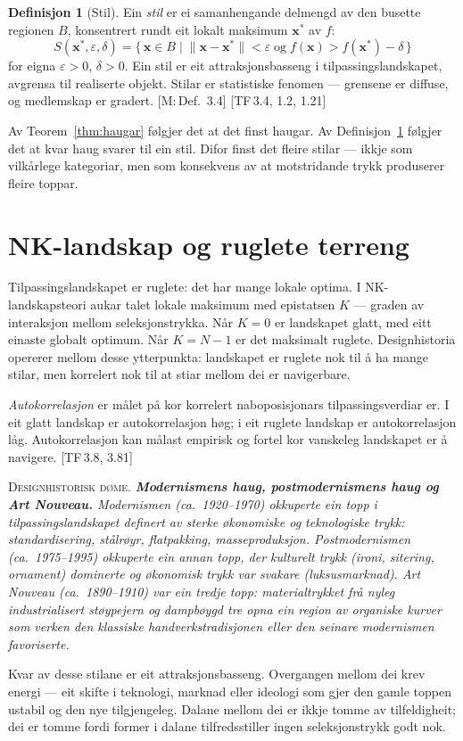 \documentclass[10pt]{book}
\theoremstyle{definition}
\newtheorem{definisjon}{Definisjon}[chapter]
\theoremstyle{plain}
\theoremstyle{remark}
\newenvironment{designhistorie}%
  {\medskip\noindent\textsc{Designhistorisk d\o me.}\itshape\enspace}%
  {\medskip}
\newcommand{\norm}[1]{\lVert #1 \rVert}
\newcommand{\TF}[1]{\textnormal{[TF\,#1]}}
\newcommand{\Mref}[1]{\textnormal{[M:\,#1]}}
\begin{document}
\begin{definisjon}[Stil]\label{def:stil}
Ein \emph{stil} er ei samanhengande delmengd av den busette regionen $B$, konsentrert rundt eit lokalt maksimum $\bm{x}^*$ av $f$:
\[
  S(\bm{x}^*, \varepsilon, \delta) = \bigl\{\, \bm{x} \in B \;\big|\;
    \norm{\bm{x} - \bm{x}^*} < \varepsilon \;\text{og}\; f(\bm{x}) > f(\bm{x}^*) - \delta \,\bigr\}
\]
for eigna $\varepsilon > 0$, $\delta > 0$. Ein stil er eit attraksjonsbasseng i tilpassingslandskapet, avgrensa til realiserte objekt. Stilar er statistiske fenomen --- grensene er diffuse, og medlemskap er gradert. \Mref{Def.~3.4} \TF{3.4, 1.2, 1.21}
\end{definisjon}

Av Teorem~\ref{thm:haugar} f\o lgjer det at det finst haugar. Av Definisjon~\ref{def:stil} f\o lgjer det at kvar haug svarer til ein stil. Difor finst det fleire stilar --- ikkje som vilk\aa rlege kategoriar, men som konsekvens av at motstridande trykk produserer fleire toppar.

\section{NK-landskap og ruglete terreng}\label{sec:landskap:NK}

Tilpassingslandskapet er ruglete: det har mange lokale optima. I NK-landskapsteori aukar talet lokale maksimum med epistatsen $K$ --- graden av interaksjon mellom seleksjonstrykka. N\aa r $K = 0$ er landskapet glatt, med eitt einaste globalt optimum. N\aa r $K = N - 1$ er det maksimalt ruglete. Designhistoria opererer mellom desse ytterpunkta: landskapet er ruglete nok til \aa{} ha mange stilar, men korrelert nok til at stiar mellom dei er navigerbare.

\emph{Autokorrelasjon} er m\aa let p\aa{} kor korrelert naboposisjonars tilpassingsverdiar er. I eit glatt landskap er autokorrelasjon h\o g; i eit ruglete landskap er autokorrelasjon l\aa g. Autokorrelasjon kan m\aa last empirisk og fortel kor vanskeleg landskapet er \aa{} navigere. \TF{3.8, 3.81}

\begin{designhistorie}
\textbf{Modernismens haug, postmodernismens haug og Art Nouveau.} Modernismen (ca.\ 1920--1970) okkuperte ein topp i tilpassingslandskapet definert av sterke \o konomiske og teknologiske trykk: standardisering, st\aa lr\o yr, flatpakking, masseproduksjon. Postmodernismen (ca.\ 1975--1995) okkuperte ein annan topp, der kulturelt trykk (ironi, sitering, ornament) dominerte og \o konomisk trykk var svakare (luksusmarknad). Art Nouveau (ca.\ 1890--1910) var ein tredje topp: materialtrykket fr\aa{} nyleg industrialisert st\o ypejern og dampb\o ygd tre opna ein region av organiske kurver som verken den klassiske handverkstradisjonen eller den seinare modernismen favoriserte.

Kvar av desse stilane er eit attraksjonsbasseng. Overgangen mellom dei krev energi --- eit skifte i teknologi, marknad eller ideologi som gjer den gamle toppen ustabil og den nye tilgjengeleg. Dalane mellom dei er ikkje tomme av tilfeldigheit; dei er tomme fordi former i dalane tilfredsstiller ingen seleksjonstrykk godt nok.
\end{designhistorie}
\end{document}
